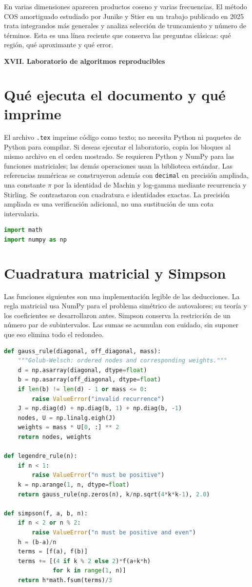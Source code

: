 \documentclass[11pt,a4paper]{article}
\theoremstyle{definition}
\newcommand{\parte}[1]{\par\bigskip\Needspace{8\baselineskip}\begin{center}{\Large\bfseries\color{azul}#1}\end{center}}
\newcounter{problema}
\begin{document}
En varias dimensiones aparecen productos coseno y varias frecuencias. El método COS amortiguado estudiado por Junike y Stier en un trabajo publicado en 2025 trata integrandos más generales y analiza selección de truncamiento y número de términos. Esta es una línea reciente que conserva las preguntas clásicas: qué región, qué aproximante y qué error.


\parte{XVII. Laboratorio de algoritmos reproducibles}
\section{Qué ejecuta el documento y qué imprime}
El archivo \texttt{.tex} imprime código como texto; no necesita Python ni paquetes de Python para compilar. Si deseas ejecutar el laboratorio, copia los bloques al mismo archivo en el orden mostrado. Se requieren Python y NumPy para las funciones matriciales; las demás operaciones usan la biblioteca estándar.
Las referencias numéricas se construyeron además con \texttt{decimal} en precisión ampliada, una constante $\pi$ por la identidad de Machin y log-gamma mediante recurrencia y Stirling. Se contrastaron con cuadratura e identidades exactas. La precisión ampliada es una verificación adicional, no una sustitución de una cota intervalaria.

\begin{lstlisting}[language=Python]
import math
import numpy as np
\end{lstlisting}
\section{Cuadratura matricial y Simpson}
Las funciones siguientes son una implementación legible de las deducciones. La regla matricial usa NumPy para el problema simétrico de autovalores; su teoría y los coeficientes se desarrollaron antes. Simpson conserva la restricción de un número par de subintervalos. Las sumas se acumulan con cuidado, sin suponer que eso elimina todo el redondeo.
\begin{lstlisting}[language=Python]
def gauss_rule(diagonal, off_diagonal, mass):
    """Golub-Welsch: ordered nodes and corresponding weights."""
    d = np.asarray(diagonal, dtype=float)
    b = np.asarray(off_diagonal, dtype=float)
    if len(b) != len(d) - 1 or mass <= 0:
        raise ValueError("invalid recurrence")
    J = np.diag(d) + np.diag(b, 1) + np.diag(b, -1)
    nodes, U = np.linalg.eigh(J)
    weights = mass * U[0, :] ** 2
    return nodes, weights

def legendre_rule(n):
    if n < 1:
        raise ValueError("n must be positive")
    k = np.arange(1, n, dtype=float)
    return gauss_rule(np.zeros(n), k/np.sqrt(4*k*k-1), 2.0)

def simpson(f, a, b, n):
    if n < 2 or n % 2:
        raise ValueError("n must be positive and even")
    h = (b-a)/n
    terms = [f(a), f(b)]
    terms += [(4 if k % 2 else 2)*f(a+k*h)
              for k in range(1, n)]
    return h*math.fsum(terms)/3
\end{lstlisting}
\end{document}
